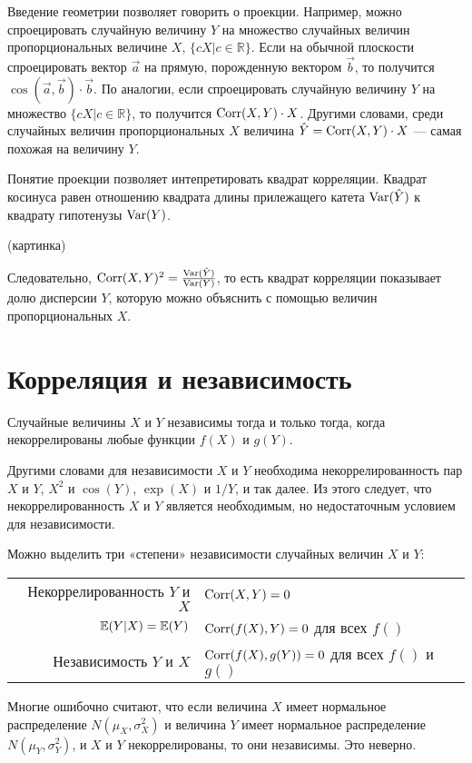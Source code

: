 \documentclass[10pt]{article}
\newcommand{\RR}{\mathbb{R}}
\begin{document}
Введение геометрии позволяет говорить о проекции. Например, можно спроецировать случайную величину $Y$ на множество случайных величин пропорциональных величине $X$, $\{cX | c\in \RR \}$. Если на обычной плоскости спроецировать вектор $\vec{a}$ на прямую, порожденную вектором $\vec{b}$, то получится $\cos(\vec{a},\vec{b})\cdot \vec{b}$. По аналогии, если спроецировать случайную величину $Y$ на множество $\{cX | c\in \RR \}$, то получится $\operatorname{Corr}(X,Y)\cdot X$. Другими словами, среди случайных величин пропорциональных $X$ величина  $\hat{Y}=\operatorname{Corr}(X,Y)\cdot X$ --- самая похожая на величину $Y$.

Понятие проекции позволяет интепретировать квадрат корреляции. Квадрат косинуса равен отношению квадрата длины прилежащего катета $\operatorname{Var}(\hat{Y})$ к квадрату гипотенузы $\operatorname{Var}(Y)$.

(картинка)

Следовательно, $\operatorname{Corr}(X,Y)^2=\frac{\operatorname{Var}(\hat{Y})}{\operatorname{Var}(Y)}$, то есть квадрат корреляции показывает долю дисперсии $Y$, которую можно объяснить с помощью величин пропорциональных $X$. 

\section{Корреляция и независимость}

\begin{theorem}
Случайные величины $X$ и $Y$ независимы тогда и только тогда, когда некоррелированы любые функции $f(X)$ и $g(Y)$.
\end{theorem}

Другими словами для независимости $X$ и $Y$ необходима некоррелированность пар $X$ и $Y$, $X^2$ и $\cos(Y)$, $\exp(X)$ и $1/Y$, и так далее. Из этого следует, что некоррелированность $X$ и $Y$ является необходимым, но недостаточным условием для независимости.

Можно выделить три «степени» независимости случайных величин $X$ и $Y$:

\begin{tabular}{rl}
\toprule
Некоррелированность $Y$ и $X$ & $\operatorname{Corr}(X,Y)=0$ \\ 
$\mathbb{E}(Y|X)=\mathbb{E}(Y)$ & $\operatorname{Corr}(f(X),Y)=0$ для всех $f()$ \\ 
Независимость $Y$ и $X$ & $\operatorname{Corr}(f(X),g(Y))=0$ для всех $f()$ и $g()$ \\ 
\bottomrule
\end{tabular} 



Многие ошибочно считают, что если величина $X$ имеет нормальное распределение $N(\mu_X, \sigma^2_X)$ и величина $Y$ имеет нормальное распределение $N(\mu_Y, \sigma^2_Y)$, и $X$ и $Y$ некоррелированы, то они независимы. Это неверно.
\end{document}
